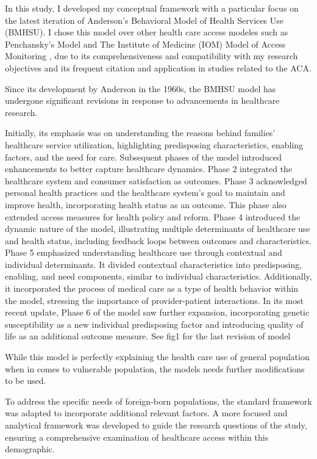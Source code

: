 \documentclass[../main.tex]{subfiles}
\begin{document}
In this study, I developed my conceptual framework with a particular focus on the latest iteration of Anderson's Behavioral Model of Health Services Use (BMHSU). I chose this model over other health care access modeles such as Penchansky’s Model and The Institute of Medicine (IOM) Model of Access Monitoring \cite{karikari-martin_use_2010}, due to its comprehensiveness and compatibility with my research objectives and its frequent citation and application in studies related to the ACA.

Since its development by Anderson in the 1960s, the BMHSU model has undergone significant revisions in response to advancements in healthcare research.

Initially, its emphasis was on understanding the reasons behind families' healthcare service utilization, highlighting predisposing characteristics, enabling factors, and the need for care. Subsequent phases of the model introduced enhancements to better capture healthcare dynamics. Phase 2 integrated the healthcare system and consumer satisfaction as outcomes. Phase 3 acknowledged personal health practices and the healthcare system's goal to maintain and improve health, incorporating health status as an outcome. This phase also extended access measures for health policy and reform. Phase 4 introduced the dynamic nature of the model, illustrating multiple determinants of healthcare use and health status, including feedback loops between outcomes and characteristics. Phase 5 emphasized understanding healthcare use through contextual and individual determinants. It divided contextual characteristics into predisposing, enabling, and need components, similar to individual characteristics. Additionally, it incorporated the process of medical care as a type of health behavior within the model, stressing the importance of provider-patient interactions. In its most recent update, Phase 6 of the model saw further expansion, incorporating genetic susceptibility as a new individual predisposing factor and introducing quality of life as an additional outcome measure. See fig1 for the last revision of model

While this model is perfectly explaining the health care use of general population when in comes to vulnerable population, the models needs further modifications to be used. 


To address the specific needs of foreign-born populations, the standard framework was adapted to incorporate additional relevant factors. A more focused and analytical framework was developed to guide the research questions of the study, ensuring a comprehensive examination of healthcare access within this demographic.
\end{document}
